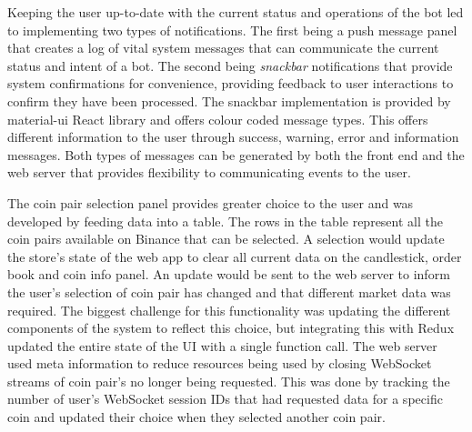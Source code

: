 Keeping the user up-to-date with the current status and operations of the bot led to implementing two types of notifications. The first being a push message panel that creates a log of vital system messages that can communicate the current status and intent of a bot. The second being \textit{snackbar} notifications that provide system confirmations for convenience, providing feedback to user interactions to confirm they have been processed. The snackbar implementation is provided by material-ui React library and offers colour coded message types. This offers different information to the user through success, warning, error and information messages. Both types of messages can be generated by both the front end and the web server that provides flexibility to communicating events to the user.



The coin pair selection panel provides greater choice to the user and was developed by feeding data into a table. The rows in the table represent all the coin pairs available on Binance that can be selected. A selection would update the store's state of the web app to clear all current data on the candlestick, order book and coin info panel. An update would be sent to the web server to inform the user's selection of coin pair has changed and that different market data was required. The biggest challenge for this functionality was updating the different components of the system to reflect this choice, but integrating this with Redux updated the entire state of the UI with a single function call. The web server used meta information to reduce resources being used by closing WebSocket streams of coin pair's no longer being requested. This was done by tracking the number of user's WebSocket session IDs that had requested data for a specific coin and updated their choice when they selected another coin pair.







